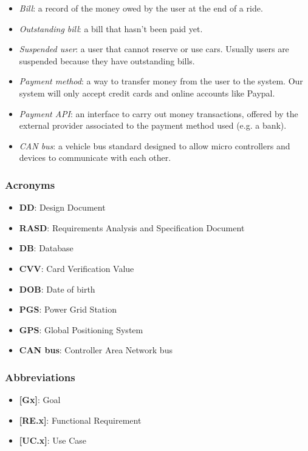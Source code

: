 \documentclass[english]{article}
\begin{document}
\begin{itemize}
\item{\textit{Bill}: a record of the money owed by the user at the end of a ride.}
\item{\textit{Outstanding bill}: a bill that hasn’t been paid yet. }
\item{\textit{Suspended user}: a user that cannot reserve or use cars. Usually users are suspended because they have outstanding bills.}
\item{\textit{Payment method}: a way to transfer money from the user to the system. Our system will only accept credit cards and online accounts like Paypal.}
\item{\textit{Payment API}: an interface to carry out money transactions, offered by the external provider associated to the payment method used (e.g. a bank).}
\item{\textit{CAN bus}: a vehicle bus standard designed to allow micro controllers and devices to communicate with each other.}
\end{itemize}

\subsubsection{Acronyms}
\begin{itemize}
\item{\textbf{DD}: Design Document}
\item{\textbf{RASD}: Requirements Analysis and Specification Document}
\item{\textbf{DB}: Database}
\item{\textbf{CVV}: Card Verification Value}
\item{\textbf{DOB}: Date of birth}
\item{\textbf{PGS}: Power Grid Station}
\item{\textbf{GPS}: Global Positioning System}
\item{\textbf{CAN bus}: Controller Area Network bus}
\end{itemize}

\subsubsection{Abbreviations}
\begin{itemize}
\item{\textbf{[Gx]}: Goal}
\item{\textbf{[RE.x]}: Functional Requirement}
\item{\textbf{[UC.x]}: Use Case}
\end{itemize}
\end{document}
